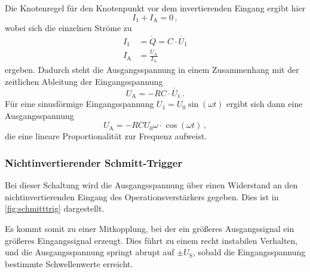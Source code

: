 \noindent
Die Knotenregel für den Knotenpunkt vor dem invertierenden Eingang ergibt hier 
\begin{equation*}
    I_1 + I_\text{A} = 0\, ,
\end{equation*}
wobei sich die einzelnen Ströme zu 
\begin{align*}
    I_1 &= \dot{Q} = C \cdot \dot{U_1} \\
    I_\text{A} &= \frac{U_\text{A}}{I_\text{A}}
\end{align*}
ergeben. Dadurch steht die Ausgangsspannung in einem Zusammenhang mit der zeitlichen Ableitung der Eingangsspannung
\begin{equation*}
    U_\text{A} = - RC \cdot \dot{U_1}\, .
\end{equation*}
Für eine sinusförmige Eingangsspannung $U_1 = U_0 \sin(\omega t)$ ergibt sich dann eine Ausgangsspannung 
\begin{equation}
    U_\text{A} = - R C U_0 \omega \cdot \cos(\omega t)\, ,
    \label{eqn:dif}
\end{equation}
die eine lineare Proportionalität zur Frequenz aufweist.

\subsubsection{Nichtinvertierender Schmitt-Trigger}

\noindent 
Bei dieser Schaltung wird die Ausgangsspannung über einen Widerstand an den nichtinvertierenden Eingang des Operationsverstärkers gegeben. Dies ist in \autoref{fig:schmitttrig} dargestellt.

\noindent
Es kommt somit zu einer Mitkopplung, bei der ein größeres Ausgangssignal ein größeres Eingangssignal erzeugt. Dies führt zu einem recht instabilen Verhalten, und die Ausgangsspannung springt abrupt auf $\pm U_\text{S}$, sobald die Eingangsspannung bestimmte Schwellenwerte erreicht.%



